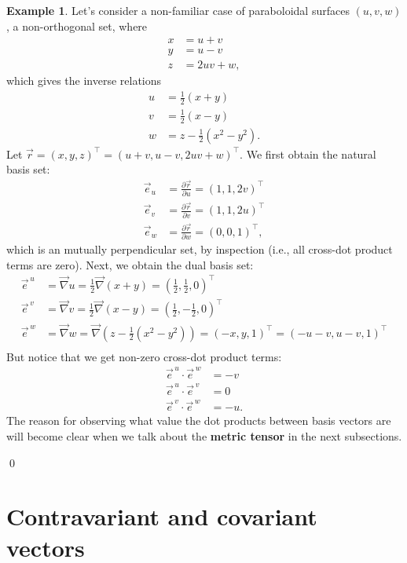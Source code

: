 \documentclass{book}
\theoremstyle{definition}
\newtheorem{exmp}{Example}[section]
\begin{document}
\begin{exmp}
Let's consider a non-familiar case of paraboloidal surfaces $(u,v,w)$, a non-orthogonal set, where
\begin{align*}
x &= u+v\\y&=u-v\\z&=2uv+w,
\end{align*}
which gives the inverse relations
\begin{align*}
u&=\frac{1}{2}(x+y)\\
v&=\frac{1}{2}(x-y)\\
w&=z-\frac{1}{2}(x^2-y^2).
\end{align*}
Let $\vec{r} = (x,y,z)^\top = (u+v, u-v, 2uv + w)^\top$. We first obtain the natural basis set:
\begin{align*}
\vec{e}_u &= \frac{\partial \vec{r}}{\partial u} = (1,1,2v)^\top \\
\vec{e}_v &= \frac{\partial \vec{r}}{\partial v} = (1,1,2u)^\top \\
\vec{e}_w &= \frac{\partial \vec{r}}{\partial w} = (0,0,1)^\top, 
\end{align*}
which is an mutually perpendicular set, by inspection (i.e., all cross-dot product terms are zero). Next, we obtain the dual basis set:
\begin{align*}
\vec{e}^{\,u} &= \vec{\nabla}u = \frac{1}{2}\vec{\nabla}(x+y) = \left( \frac{1}{2}, \frac{1}{2},0\right) ^\top\\
\vec{e}^{\,v} &= \vec{\nabla}v = \frac{1}{2}\vec{\nabla}(x-y) = \left( \frac{1}{2}, -\frac{1}{2},0\right) ^\top\\
\vec{e}^{\,w} &= \vec{\nabla}w = \vec{\nabla}\left( z-\frac{1}{2}(x^2-y^2)\right)  = (-x,y,1)^\top = (-u-v,u-v,1)^\top\\
\end{align*}
But notice that we get non-zero cross-dot product terms:
\begin{align*}
\vec{e}^{\,u}\cdot\vec{e}^{\,w} &= -v \\
\vec{e}^{\,u}\cdot\vec{e}^{\,v} &= 0 \\
\vec{e}^{\,v}\cdot\vec{e}^{\,w} &= -u. 
\end{align*}
The reason for observing what value the dot products between basis vectors are will become clear when we talk about the \textbf{metric tensor} in the next subsections.
\end{exmp}\qed
\section{Contravariant and covariant vectors}
\end{document}
